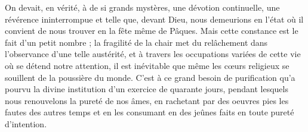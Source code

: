  On devait, en vérité, à de si grands mystères, une dévotion continuelle, une révérence ininterrompue et telle que, devant Dieu, nous demeurions en l’état où il convient de nous trouver en la fête même de Pâques. Mais cette constance est le fait d’un petit nombre ; la fragilité de la chair met du relâchement dans l’observance d’une telle austérité, et à travers les occupations variées de cette vie où se détend notre attention, il est inévitable que même les cœurs religieux se souillent de la poussière du monde. C’est à ce grand besoin de purification qu’a pourvu la divine institution d’un exercice de quarante jours, pendant lesquels nous renouvelons la pureté de nos âmes, en rachetant par des oeuvres pies les fautes des autres temps et en les consumant en des jeûnes faits en toute pureté d’intention.